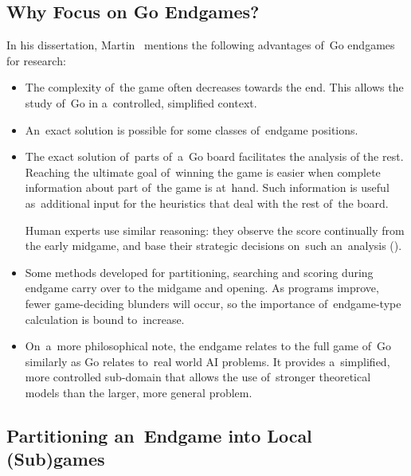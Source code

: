 \subsection{Why Focus on Go Endgames?}

In his dissertation, Martin~\Mueller{} mentions the following advantages of~Go endgames for research:
\begin{itemize}
  \item The complexity of~the game often decreases towards the end.
    This allows the study of~Go in a~controlled, simplified context.
  \item An~exact solution is possible for some classes of~endgame positions.
  \item The exact solution of~parts of~a~Go board facilitates the analysis of the rest.
    Reaching the ultimate goal of~winning the game is easier when complete information about part of~the game is at~hand.
    Such information is useful as~additional input for the heuristics that deal with the rest of~the board.

    Human experts use similar reasoning: they observe the score continually from the early midgame, and base their strategic decisions on~such an~analysis (\cite{Takagawa85}).
  \item Some methods developed for partitioning, searching and scoring during endgame carry over to the midgame and opening.
    As programs improve, fewer game-deciding blunders will occur, so the importance of~endgame-type calculation is bound to~increase.
  \item On~a~more philosophical note, the endgame relates to the full game of~Go similarly as Go relates to~real world AI problems.
    It provides a~simplified, more controlled sub-domain that allows the use of~stronger theoretical models than the larger, more general problem.
\end{itemize}

\subsection{Partitioning an~Endgame into Local (Sub)games}

